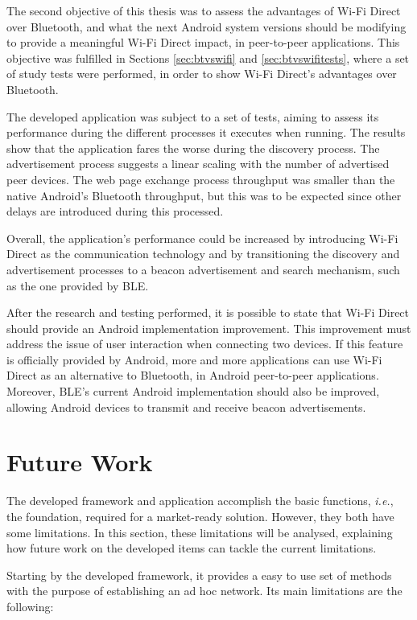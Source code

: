 The second objective of this thesis was to assess the advantages of Wi-Fi Direct over Bluetooth, and what the next Android system versions should be modifying to provide a meaningful Wi-Fi Direct impact, in peer-to-peer applications. This objective was fulfilled in Sections \ref{sec:btvswifi} and \ref{sec:btvswifitests}, where a set of study tests were performed, in order to show Wi-Fi Direct's advantages over Bluetooth.

The developed application was subject to a set of tests, aiming to assess its performance during the different processes it executes when running. The results show that the application fares the worse during the discovery process. The advertisement process suggests a linear scaling with the number of advertised peer devices. The web page exchange process throughput was smaller than the native Android's Bluetooth throughput, but this was to be expected since other delays are introduced during this processed.

Overall, the application's performance could be increased by introducing Wi-Fi Direct as the communication technology and by transitioning the discovery and advertisement processes to a beacon advertisement and search mechanism, such as the one provided by \gls{BLE}.

After the research and testing performed, it is possible to state that Wi-Fi Direct should provide an Android implementation improvement. This improvement must address the issue of user interaction when connecting two devices. If this feature is officially provided by Android, more and more applications can use Wi-Fi Direct as an alternative to Bluetooth, in Android peer-to-peer applications. Moreover, \gls{BLE}'s current Android implementation should also be improved, allowing Android devices to transmit and receive beacon advertisements.

\section{Future Work}
\label{sec:futurework}

The developed framework and application accomplish the basic functions, \textit{i.e.}, the foundation, required for a market-ready solution. However, they both have some limitations. In this section, these limitations will be analysed, explaining how future work on the developed items can tackle the current limitations.

Starting by the developed framework, it provides a easy to use set of methods with the purpose of establishing an ad hoc network. Its main limitations are the following:

